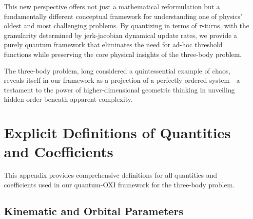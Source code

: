 \documentclass{article}
\begin{document}
This new perspective offers not just a mathematical reformulation but a fundamentally different conceptual framework for understanding one of physics' oldest and most challenging problems. By quantizing in terms of $\tau$-turns, with the granularity determined by jerk-jacobian dynamical update rates, we provide a purely quantum framework that eliminates the need for ad-hoc threshold functions while preserving the core physical insights of the three-body problem.

The three-body problem, long considered a quintessential example of chaos, reveals itself in our framework as a projection of a perfectly ordered system—a testament to the power of higher-dimensional geometric thinking in unveiling hidden order beneath apparent complexity.

\appendix
\section{Explicit Definitions of Quantities and Coefficients}
\label{appendix:definitions}

This appendix provides comprehensive definitions for all quantities and coefficients used in our quantum-OXI framework for the three-body problem.

\subsection{Kinematic and Orbital Parameters}
\end{document}
